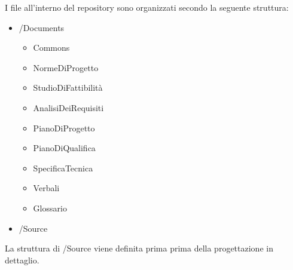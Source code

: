 					I file all’interno del repository sono organizzati secondo la seguente struttura:
					\begin{itemize}
						\item /Documents
						\begin{itemize}
							\item Commons
							\item NormeDiProgetto
							\item StudioDiFattibilità
							\item AnalisiDeiRequisiti
							\item PianoDiProgetto
							\item PianoDiQualifica
							\item SpecificaTecnica
							\item Verbali
							\item Glossario
						\end{itemize}
						\item /Source
					\end{itemize}
					La struttura di /Source viene definita prima prima della progettazione in dettaglio.


